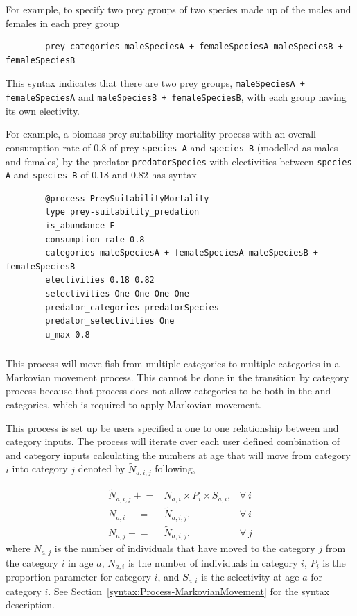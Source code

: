 For example, to specify two prey groups of two species made up of the males and females in each prey group

{\small{\begin{verbatim}
		prey_categories maleSpeciesA + femaleSpeciesA maleSpeciesB + femaleSpeciesB
\end{verbatim}}}

This syntax indicates that there are two prey groups, \texttt{maleSpeciesA + femaleSpeciesA} and \texttt{maleSpeciesB + femaleSpeciesB}, with each group having its own electivity.

For example, a biomass prey-suitability mortality process with an overall consumption rate of $0.8$ of prey \texttt{species A} and \texttt{species B} (modelled as males and females) by the predator \texttt{predatorSpecies} with electivities between \texttt{species A} and \texttt{species B} of $0.18$ and $0.82$ has syntax

{\small{\begin{verbatim}
		@process PreySuitabilityMortality
		type prey-suitability_predation
		is_abundance F
		consumption_rate 0.8
		categories maleSpeciesA + femaleSpeciesA maleSpeciesB + femaleSpeciesB
		electivities 0.18 0.82
		selectivities One One One One
		predator_categories predatorSpecies
		predator_selectivities One
		u_max 0.8
\end{verbatim}}}

\subsubsection{}\label{sec:Process-MarkovianMovement}
This process will move fish from multiple categories to multiple categories in a Markovian movement process. This cannot be done in the transition by category process because that process does not allow categories to be both in the  and  categories, which is required to apply Markovian movement.

This process is set up be users specified a one to one relationship between  and  category inputs. The process will iterate over each user defined combination of  and  category inputs calculating the numbers at age that will move from category \(i\) into category \(j\) denoted by \(\tilde{N}_{a,i,j}\) following,

\begin{align}
	\tilde{N}_{a,i,j} \mathrel{+}=& N_{a,i} \times P_i \times S_{a,i}, & \forall \ i \\
	N_{a,i} \mathrel{-}=& \tilde{N}_{a,i,j}, & \forall \ i \\
	N_{a,j} \mathrel{+}=& \tilde{N}_{a,i,j}, & \forall \ j
\end{align}
where $N_{a,j}$ is the number of individuals that have moved to the  category $j$ from the  category $i$ in age $a$, $N_{a,i}$ is the number of individuals in category $i$, $P_i$ is the proportion parameter for category $i$, and $S_{a,i}$ is the selectivity at age $a$ for category $i$. See Section~\ref{syntax:Process-MarkovianMovement} for the syntax description. 


